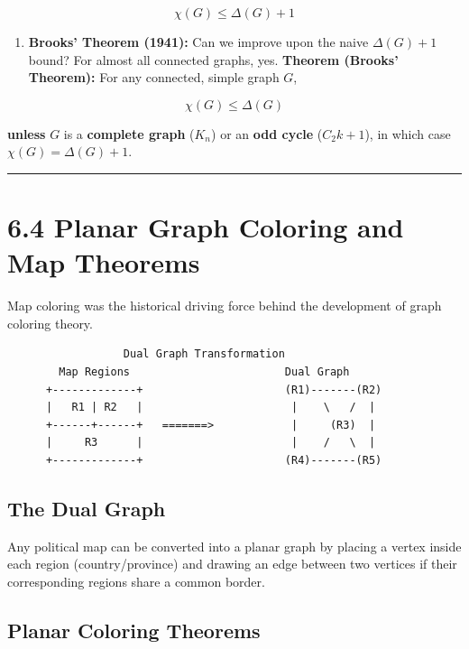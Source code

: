 \documentclass[
]{book}
\providecommand{\tightlist}{%
  \setlength{\itemsep}{0pt}\setlength{\parskip}{0pt}}
\theoremstyle{definition}
\theoremstyle{definition}
\theoremstyle{definition}
\theoremstyle{definition}
\theoremstyle{remark}
\begin{document}
\[\chi(G) \le \Delta(G) + 1\]

\begin{enumerate}
\def\labelenumi{\arabic{enumi}.}
\setcounter{enumi}{1}
\tightlist
\item
  \textbf{Brooks' Theorem (1941):}
  Can we improve upon the naive \(\Delta(G) + 1\) bound? For almost all connected graphs, yes.
  \textbf{Theorem (Brooks' Theorem):}
  For any connected, simple graph \(G\),
\end{enumerate}

\[\chi(G) \le \Delta(G)\]

\textbf{unless} \(G\) is a \textbf{complete graph} (\(K_n\)) or an \textbf{odd cycle} (\(C_2k+1\)), in which case \(\chi(G) = \Delta(G) + 1\).

\begin{center}\rule{0.5\linewidth}{0.5pt}\end{center}

\section{6.4 Planar Graph Coloring and Map Theorems}\label{planar-graph-coloring-and-map-theorems}

Map coloring was the historical driving force behind the development of graph coloring theory.

\begin{verbatim}
                  Dual Graph Transformation
        Map Regions                        Dual Graph
      +-------------+                      (R1)-------(R2)
      |   R1 | R2   |                       |    \   /  |
      +------+------+   =======>            |     (R3)  |
      |     R3      |                       |    /   \  |
      +-------------+                      (R4)-------(R5)
\end{verbatim}

\subsection{The Dual Graph}\label{the-dual-graph}

Any political map can be converted into a planar graph by placing a vertex inside each region (country/province) and drawing an edge between two vertices if their corresponding regions share a common border.

\subsection{Planar Coloring Theorems}\label{planar-coloring-theorems}
\end{document}
